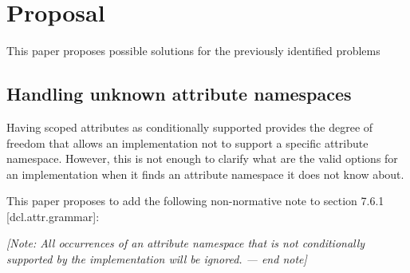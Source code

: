 \section{Proposal}

This paper proposes possible solutions for the previously identified problems

\subsection{Handling unknown attribute namespaces}

Having scoped attributes as conditionally supported provides the degree of
freedom that allows an implementation not to support a specific attribute namespace.
However, this is not enough to clarify what are the valid options for an
implementation when it finds an attribute namespace it does not know about.

This paper proposes to add the following non-normative note to section 7.6.1 [dcl.attr.grammar]:

\vspace{1em}
\emph{[Note: All occurrences of an attribute namespace that is not conditionally supported
by the implementation will be ignored. --- end note]}

